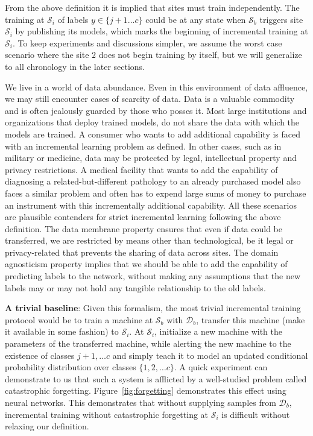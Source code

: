 \documentclass[10pt,twocolumn,letterpaper]{article}
\def \cS{{\mathcal{S}}}
\def \cD{{\mathcal{D}}}
\begin{document}
	From the above definition it is implied that sites must train independently. 
	The training at $\cS_i$ of labels $y \in \{j+1 \hdots c\}$ could be at any state when $\cS_b$ triggers site $\cS_i$ by publishing its models, which marks the beginning of incremental training at $\cS_i$. 
	To keep experiments and discussions simpler, we assume the worst case scenario where the site $2$ does not begin training by itself, but we will generalize to all chronology in the later sections.
	
	We live in a world of data abundance. 
	Even in this environment of data affluence, we may still encounter cases of scarcity of data. 
	Data is a valuable commodity and is often jealously guarded by those who posses it. 
	Most large institutions and organizations that deploy trained models, do not share the data with which the models are trained.
	A consumer who wants to add additional capability is faced with an incremental learning problem as defined. 
	In other cases, such as in military or medicine, data may be protected by legal, intellectual property and privacy restrictions. 
	A medical facility that wants to add the capability of diagnosing a related-but-different pathology to an already purchased model also faces a similar problem and often has to expend large sums of money to purchase an instrument with this incrementally additional capability. 
	All these scenarios are plausible contenders for strict incremental learning following the above definition.
	The data membrane property ensures that even if data could be transferred, we are restricted by means other than technological, be it legal or privacy-related that prevents the sharing of data across sites. 
	The domain agnosticism property implies that we should be able to add the capability of predicting labels to the network, without making any assumptions that the new labels may or may not hold any tangible relationship to the old labels. 
	
	\noindent\textbf{A trivial baseline}: Given this formalism, the most trivial incremental training protocol would be to train a machine at $\cS_b$ with $\cD_b$, transfer this machine (make it available in some fashion) to $\cS_i$. 
	At $\cS_i$, initialize a new machine with the parameters of the transferred machine, while alerting the new machine to the existence of classes $j+1, \hdots c$ and simply teach it to model an updated conditional probability distribution over classes $\{1,2, \hdots c\}$. 
	A quick experiment can demonstrate to us that such a system is afflicted by a well-studied problem called catastrophic forgetting. 
	Figure~\ref{fig:forgetting} demonstrates this effect using neural networks. 
	This demonstrates that without supplying samples from $\cD_b$, incremental training without catastrophic forgetting at $\cS_i$ is difficult without relaxing our definition. 
	
\end{document}

